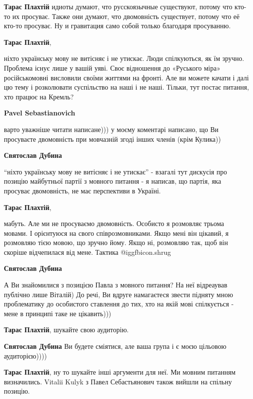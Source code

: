 \begin{itemize}
\begin{itemize}
\textbf{Тарас Плахтій} идиоты думают, что русскоязычные существуют, потому что кто-то их просуває. Также они думают, что двомовність существует, потому что её кто-то просуває. Ну и гравитация само собой только благодаря просуванню.

\textbf{Тарас Плахтій}, 

ніхто українську мову не витісняє і не утискає. Люди спілкуються, як їм зручно.
Проблема існує лише у вашій уяві. Своє відношення до «Руського міра»
російськомовні висловили своїми життями на фронті. Але ви можете качати і далі
цю тему і розколювати суспільство на наші і не наші. Тільки, тут постає
питання, хто працює на Кремль?

\textbf{Pavel Sebastianovich} 

варто уважніше читати написане))) у моєму коментарі написано, що Ви просуваєте
двомовність при мовчазній згоді інших членів (крім Кулика))

\textbf{Святослав Дубина} 

\enquote{ніхто українську мову не витісняє і не утискає} - взагалі тут дискусія про
позицію майбутньої партії з мовного питання - я написав, що партія, яка
просуває двомовність, не має перспективи в Україні.

\textbf{Тарас Плахтій}, 

мабуть. Але ми не просуваємо двомовність. Особисто я розмовляє трьома мовами. І
орієнтуюся на свого співрозмовниками. Якщо мені він цікавий, я розмовляю тією
мовою, що зручно йому. Якщо ні, розмовляю так, щоб він скоріше відчепилася від
мене. Тактика  @igg{fbicon.shrug} 

\textbf{Святослав Дубина} 

А Ви знайомилися з позицією Павла з мовного питання? На неї відреаував публічно
лише Віталій) До речі, Ви вдруге намагаєтеся звести підняту мною проблематику
до особистого ставлення до тих, хто на якій мові спілкується - мене в принципі
таке не цікавить)))


\textbf{Тарас Плахтій}, шукайте свою аудиторію.

\textbf{Святослав Дубина} Ви будете сміятися, але ваша група і є моєю цільовою аудиторією))))

\textbf{Тарас Плахтій}, ну то шукайте інші аргументи для неї. Ми мовним питанням визначились. Vitalii Kulyk з Павел Себастьянович також вийшли на спільну позицію.


\end{itemize}
\end{itemize}
